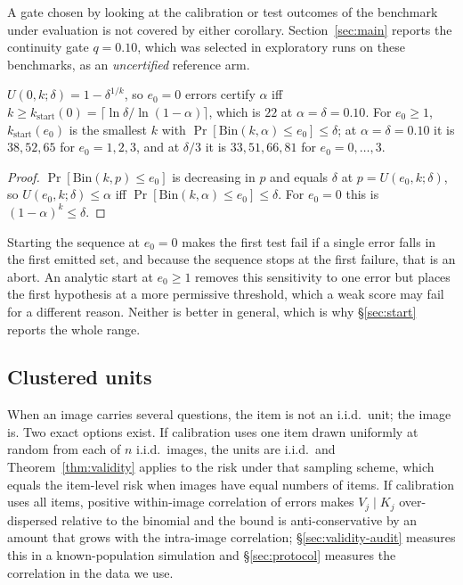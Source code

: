 A gate chosen by looking at the calibration or test outcomes of the benchmark under evaluation is not
covered by either corollary. Section~\ref{sec:main} reports the continuity gate $q=0.10$, which was selected in exploratory runs on these benchmarks, as an
\emph{uncertified} reference arm.

\begin{lemma}
\label{lem:kstart}
$U(0,k;\delta)=1-\delta^{1/k}$, so $e_0=0$ errors certify $\alpha$ iff
$k\ge k_{\mathrm{start}}(0)=\lceil\ln\delta/\ln(1-\alpha)\rceil$, which is $22$ at $\alpha=\delta=0.10$.
For $e_0\ge1$, $k_{\mathrm{start}}(e_0)$ is the smallest $k$ with $\Pr[\mathrm{Bin}(k,\alpha)\le e_0]\le\delta$;
at $\alpha=\delta=0.10$ it is $38,52,65$ for $e_0=1,2,3$, and at $\delta/3$ it is $33,51,66,81$ for $e_0=0,\dots,3$.
\end{lemma}
\begin{proof}
$\Pr[\mathrm{Bin}(k,p)\le e_0]$ is decreasing in $p$ and equals $\delta$ at $p=U(e_0,k;\delta)$, so
$U(e_0,k;\delta)\le\alpha$ iff $\Pr[\mathrm{Bin}(k,\alpha)\le e_0]\le\delta$. For $e_0=0$ this is
$(1-\alpha)^k\le\delta$.
\end{proof}

Starting the sequence at $e_0=0$ makes the first test fail if a single error falls in the first
emitted set, and because the sequence stops at the first failure, that is an abort. An analytic start
at $e_0\ge1$ removes this sensitivity to one error but places the first hypothesis at a more
permissive threshold, which a weak score may fail for a different reason. Neither is better in
general, which is why \S\ref{sec:start} reports the whole range.

\subsection{Clustered units}
\label{sec:clusters}

When an image carries several questions, the item is not an i.i.d.\ unit; the image is. Two exact
options exist. If calibration uses one item drawn uniformly at random from each of $n$ i.i.d.\ images,
the units are i.i.d.\ and Theorem~\ref{thm:validity} applies to the risk under that sampling
scheme, which equals the item-level risk when images have equal numbers of items. If calibration uses all
items, positive within-image correlation of errors makes $V_j\mid K_j$ over-dispersed relative to the
binomial and the bound is anti-conservative by an amount that grows with the intra-image
correlation; \S\ref{sec:validity-audit} measures this in a known-population simulation and
\S\ref{sec:protocol} measures the correlation in the data we use.

